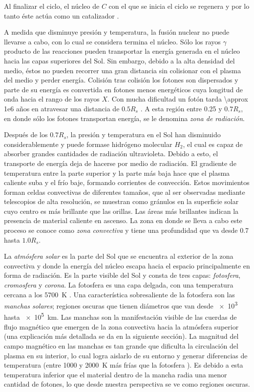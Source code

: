 Al finalizar el ciclo, el núcleo de $C$ con el que se inicia el ciclo se regenera y por lo tanto éste actúa como un catalizador \cite{golub14}.

A medida que disminuye presión y temperatura, la fusión nuclear no puede llevarse a cabo, con lo cual se considera termina el núcleo. Sólo los rayos $\gamma$ producto de las reacciones pueden transportar la energía generada en el núcleo hacia las capas superiores del Sol. Sin embargo, debido a la alta densidad del medio, éstos no pueden recorrer una gran distancia sin colisionar con el plasma del medio y perder energía. Colisión tras colisión los fotones son dispersados y parte de su energía es convertida en fotones menos energéticos cuya longitud de onda hacia el rango de los rayos $X$. Con mucha dificultad un fotón tarda \num{\approx 1e6} años en atravesar una distancia de $\num{0.5}R_{s}$ \cite{fisica13}. A esta región entre \num{0.25} y $\num{0.7}R_{s}$, en donde sólo los fotones transportan energía, se le denomina \emph{zona de radiación}.

Después de los $\num{0.7}R_{s}$, la presión y temperatura en el Sol han disminuido considerablemente y puede formase hidrógeno molecular $H_{2}$, el cual es capaz de absorber grandes cantidades de radiación ultravioleta. Debido a esto, el transporte de energía deja de hacerse por medio de radiación. El gradiente de temperatura entre la parte superior y la parte más baja hace que el plasma caliente suba y el frío baje, formando corrientes de convección. Estos movimientos forman celdas convectivas de diferentes tamaños, que al ser observadas mediante telescopios de alta resolución, se muestran como gránulos en la superficie solar cuyo centro es más brillante que las orillas. Las áreas más brillantes indican la presencia de material caliente en ascenso. La zona en donde se lleva a cabo este proceso se conoce como \emph{zona convectiva} y tiene una profundidad que va desde \num{0.7} hasta $\num{1.0}R_{s}$.

La \emph{atmósfera solar} es la parte del Sol que se encuentra al exterior de la zona convectiva y donde la energía del núcleo escapa hacia el espacio principalmente en forma de radiación. Es la parte visible del Sol y consta de tres capas: \emph{fotosfera}, \emph{cromosfera} y \emph{corona}. La fotosfera es una capa delgada, con una temperatura cercana a los \SI{5700}{\kelvin} \cite{noyes82}. Una característica sobresaliente de la fotosfera son las \emph{manchas solares}; regiones oscuras que tienen diámetros que van desde \num{e3} hasta \SI{e5}{\kilo\metre}. Las manchas son la manifestación visible de las cuerdas de flujo magnético que emergen de la zona convectiva hacia la atmósfera superior (una explicación más detallada se da en la siguiente sección). La magnitud del campo magnético en las manchas es tan grande que dificulta la circulación del plasma en su interior, lo cual logra aislarlo de su entorno y generar diferencias de temperatura (entre \num{1000} y \SI{2000}{\kelvin} más frías que la fotosfera \cite{fisica13}). Es debido a esta temperatura inferior que el material dentro de la mancha radia una menor cantidad de fotones, lo que desde nuestra perspectiva se ve como regiones oscuras.

